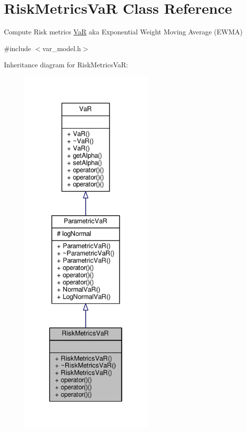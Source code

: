 \hypertarget{classRiskMetricsVaR}{}\section{Risk\+Metrics\+VaR Class Reference}
\label{classRiskMetricsVaR}


Compute Risk metrics \hyperlink{classVaR}{VaR} aka Exponential Weight Moving Average (E\+W\+MA)  




{\ttfamily \#include $<$var\+\_\+model.\+h$>$}



Inheritance diagram for Risk\+Metrics\+VaR\+:
\nopagebreak
\begin{figure}[H]
\begin{center}
\leavevmode
\includegraphics[width=190pt]{classRiskMetricsVaR__inherit__graph}
\end{center}
\end{figure}


